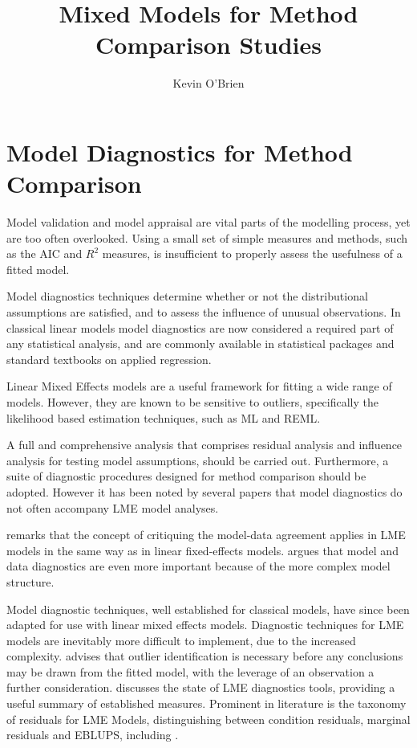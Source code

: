 \documentclass[12pt, a4paper]{report}
\author{ } \date{ }
\theoremstyle{definition}
\theoremstyle{remark}
\begin{document}
\author{Kevin O'Brien}
\title{Mixed Models for Method Comparison Studies}
\tableofcontents



\newpage
\chapter{Model Diagnostics for Method Comparison}
Model validation and model appraisal are vital parts of the modelling process, yet are too often overlooked. Using a small set of simple measures and methods, such as the AIC and $R^2$ measures, is insufficient to properly assess the usefulness of a fitted model.

Model diagnostics techniques determine whether or not the distributional assumptions are satisfied, and to assess the influence of unusual observations. In classical linear models model diagnostics are now considered a required part of any statistical analysis, and are commonly available in statistical packages and standard textbooks on applied regression.


Linear Mixed Effects models are a useful framework for fitting a wide range of models. However, they are known to be sensitive to outliers, specifically the likelihood based estimation techniques, such as ML and REML. 

A full and comprehensive analysis that comprises residual analysis and influence analysis for testing model assumptions, should be carried out. Furthermore, a suite of diagnostic procedures designed for method comparison should be adopted. However it has been noted by several papers \citep{Christensen, schabenberger} that model diagnostics do not often accompany LME model analyses. 

\citet{schabenberger} remarks that the concept of critiquing the model-data agreement applies in LME models in the same way as in linear fixed-effects models. \citet{west} argues that model and data diagnostics are even more important because of the more complex model structure. 


Model diagnostic techniques, well established for classical models, have since been adapted for use with linear mixed effects models. Diagnostic techniques for LME models are inevitably more difficult to implement, due to the increased complexity. \citet{Christensen} advises that outlier identification is necessary before any conclusions may be drawn from the fitted model, with the leverage of an observation a further consideration. \citet{schabenberger} discusses the state of LME diagnostics tools, providing a useful summary of established measures. Prominent in literature is the taxonomy of residuals for LME Models, distinguishing between condition residuals, marginal residuals and EBLUPS, including \citet{hilden1995, schabenberger, west, NobreSinger2007}. 
\end{document}
